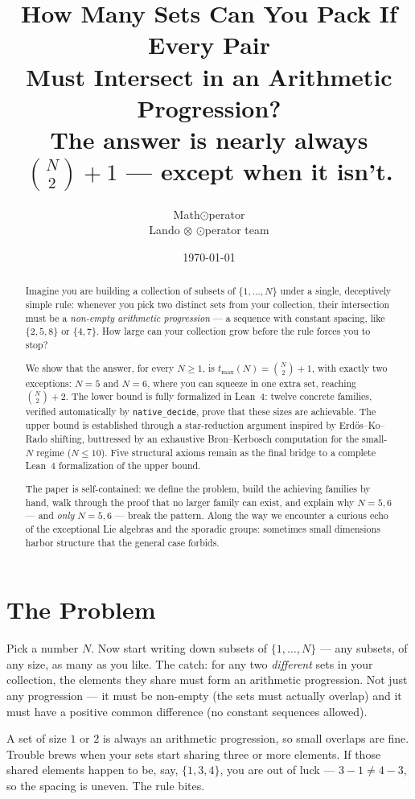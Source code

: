 \documentclass[11pt,a4paper]{article}
\title{How Many Sets Can You Pack If Every Pair\\
       Must Intersect in an Arithmetic Progression?\\
       \large The answer is nearly always $\binom{N}{2}+1$ ---
       except when it isn't.}
\author{Math$\odot$perator\\
        \small Lando $\otimes$ $\odot$perator team}
\date{\today}
\theoremstyle{definition}
\begin{document}
\maketitle

\begin{abstract}
Imagine you are building a collection of subsets of $\{1,\dots,N\}$ under a single,
deceptively simple rule: whenever you pick two distinct sets from your collection,
their intersection must be a \emph{non-empty arithmetic progression} --- a sequence
with constant spacing, like $\{2,5,8\}$ or $\{4,7\}$. How large can your collection
grow before the rule forces you to stop?

We show that the answer, for every $N \geq 1$, is $t_{\max}(N) = \binom{N}{2}+1$,
with exactly two exceptions: $N=5$ and $N=6$, where you can squeeze in one extra
set, reaching $\binom{N}{2}+2$. The lower bound is fully formalized in Lean~4:
twelve concrete families, verified automatically by \texttt{native\_decide}, prove
that these sizes are achievable. The upper bound is established through a
star-reduction argument inspired by Erd\H{o}s--Ko--Rado shifting, buttressed by an
exhaustive Bron--Kerbosch computation for the small-$N$ regime ($N \leq 10$). Five
structural axioms remain as the final bridge to a complete Lean~4 formalization of
the upper bound.

The paper is self-contained: we define the problem, build the achieving families by
hand, walk through the proof that no larger family can exist, and explain why
$N=5,6$ --- and \emph{only} $N=5,6$ --- break the pattern. Along the way we
encounter a curious echo of the exceptional Lie algebras and the sporadic groups:
sometimes small dimensions harbor structure that the general case forbids.
\end{abstract}

\section{The Problem}

Pick a number $N$. Now start writing down subsets of $\{1,\dots,N\}$ --- any subsets,
of any size, as many as you like. The catch: for any two \emph{different} sets in
your collection, the elements they share must form an arithmetic progression. Not
just any progression --- it must be non-empty (the sets must actually overlap) and it
must have a positive common difference (no constant sequences allowed).

A set of size $1$ or $2$ is always an arithmetic progression, so small overlaps are
fine. Trouble brews when your sets start sharing three or more elements. If those
shared elements happen to be, say, $\{1,3,4\}$, you are out of luck --- $3-1 \neq
4-3$, so the spacing is uneven. The rule bites.
\end{document}
